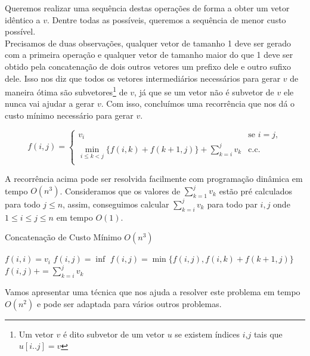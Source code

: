 Queremos realizar uma sequência destas operações de forma a obter um vetor idêntico a $v$. Dentre todas as possíveis, queremos a sequência de menor custo possível. \\

Precisamos de duas observações, qualquer vetor de tamanho 1 deve ser gerado com a primeira operação e qualquer vetor de tamanho maior do que 1 deve ser obtido pela concatenação de dois outros vetores um prefixo dele e outro sufixo dele. Isso nos diz que todos os vetores intermediários necessários para gerar $v$ de maneira ótima são subvetores\footnote{Um vetor $v$ é dito subvetor de um vetor $u$ se existem índices $i$,$j$ tais que $u[i..j] = v$} de $v$, já que se um vetor não é subvetor de $v$ ele nunca vai ajudar a gerar $v$. Com isso, concluímos uma recorrência que nos dá o custo mínimo necessário para gerar $v$. 

$$
f(i,j) = \begin{cases}
    v_i & \text{se } i = j, \\
    \min\limits_{i \leq k < j} \Big\{ f(i,k) + f(k+1,j) \Big\} + \sum\limits_{k=i}^j v_k & \text{c.c.} \\
\end{cases}
$$

A recorrência acima pode ser resolvida facilmente com programação dinâmica em tempo $O(n^3)$. Consideramos que os valores de $\sum\limits_{k=1}^j v_k$ estão pré calculados para todo $j \leq n$, assim, conseguimos calcular $\sum\limits_{k=i}^j v_k$ para todo par $i,j$ onde $1 \leq i \leq j \leq n$ em tempo $O(1)$.
\begin{algorithm}[h]
\caption{Concatenação de Custo Mínimo $O(n^3)$}
\label{MinCostConcat}
\begin{algorithmic}[1]
        \State $f(i,i) = v_i$
    \EndFor
            \State $f(i,j) = \inf$
                \State $f(i,j) = \min\{f(i,j), f(i,k)+f(k+1,j)\}$
            \EndFor
            \State $f(i,j) += \sum\limits_{k=i}^j v_k$
        \EndFor
    \EndFor
    \State \Return {}
\EndFunction
\end{algorithmic}
\end{algorithm}

Vamos apresentar uma técnica que nos ajuda a resolver este problema em tempo $O(n^2)$ e pode ser adaptada para vários outros problemas.


